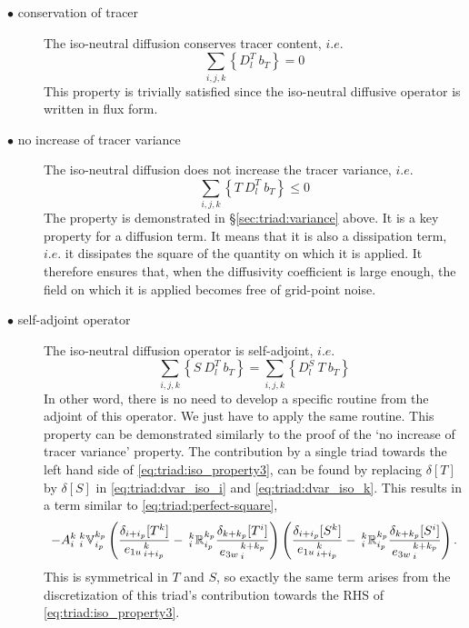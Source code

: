\documentclass[NEMO_book]{subfiles}
\begin{document}
\begin{description}
\item[$\bullet$ conservation of tracer] The iso-neutral diffusion
  conserves tracer content, $i.e.$
  \begin{equation} \label{eq:triad:iso_property1} \sum_{i,j,k} \left\{ D_l^T \
      b_T \right\} = 0
  \end{equation}
  This property is trivially satisfied since the iso-neutral diffusive
  operator is written in flux form.

\item[$\bullet$ no increase of tracer variance] The iso-neutral diffusion
  does not increase the tracer variance, $i.e.$
  \begin{equation} \label{eq:triad:iso_property2} \sum_{i,j,k} \left\{ T \ D_l^T
      \ b_T \right\} \leq 0
  \end{equation}
  The property is demonstrated in
  \S\ref{sec:triad:variance} above. It is a key property for a diffusion
  term. It means that it is also a dissipation term, $i.e.$ it
  dissipates the square of the quantity on which it is applied.  It
  therefore ensures that, when the diffusivity coefficient is large
  enough, the field on which it is applied becomes free of grid-point
  noise.

\item[$\bullet$ self-adjoint operator] The iso-neutral diffusion
  operator is self-adjoint, $i.e.$
  \begin{equation} \label{eq:triad:iso_property3} \sum_{i,j,k} \left\{ S \ D_l^T
      \ b_T \right\} = \sum_{i,j,k} \left\{ D_l^S \ T \ b_T \right\}
  \end{equation}
  In other word, there is no need to develop a specific routine from
  the adjoint of this operator. We just have to apply the same
  routine. This property can be demonstrated similarly to the proof of
  the `no increase of tracer variance' property. The contribution by a
  single triad towards the left hand side of \eqref{eq:triad:iso_property3}, can
  be found by replacing $\delta[T]$ by $\delta[S]$ in \eqref{eq:triad:dvar_iso_i}
  and \eqref{eq:triad:dvar_iso_k}. This results in a term similar to
  \eqref{eq:triad:perfect-square},
\begin{equation}
  \label{eq:triad:TScovar}
  - {A}_i^k{\:} _i^k\mathbb{V}_{i_p}^{k_p}
  \left(
    \frac{ \delta_{i+ i_p}[T^k] }{ {e_{1u}}_{\,i + i_p}^{\,k} }
    -{\:}_i^k\mathbb{R}_{i_p}^{k_p}
    \frac{ \delta_{k+k_p} [T^i] }{{e_{3w}}_{\,i}^{\,k+k_p} }
  \right)
  \left(
    \frac{ \delta_{i+ i_p}[S^k] }{ {e_{1u}}_{\,i + i_p}^{\,k} }
    -{\:}_i^k\mathbb{R}_{i_p}^{k_p}
    \frac{ \delta_{k+k_p} [S^i] }{{e_{3w}}_{\,i}^{\,k+k_p} }
  \right).
\end{equation}
This is symmetrical in $T $ and $S$, so exactly the same term arises
from the discretization of this triad's contribution towards the
RHS of \eqref{eq:triad:iso_property3}.
\end{description}
\end{document}
